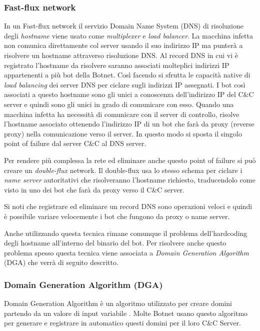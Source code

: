 \subsubsection{Fast-flux network}
\label{fast-flux-network-label}
In un Fast-flux network il servizio Domain Name System (DNS) di risoluzione degli \textit{hostname} viene usato come \textit{multiplexer} e \textit{load balancer}. La macchina infetta non comunica direttamente col server usando il suo indirizzo IP ma punterà a risolvere un hostname attraverso risoluzione DNS. Al record DNS in cui vi è registrato l'hostname da risolvere saranno associati molteplici indirizzi IP appartenenti a più bot della Botnet. Così facendo si sfrutta le capacità native di \textit{load balancing} dei server DNS per ciclare sugli indirizzi IP assegnati. I bot così associati a questo hostname sono gli unici a conoscenza dell'indirizzo IP del C\&C server e quindi sono gli unici in grado di comunicare con esso. 
Quando una macchina infetta ha necessità di comunicare con il server di controllo, risolve l'hostname associato ottenendo l'indirizzo IP di un bot che farà da proxy (reverse proxy) nella comunicazione verso il server.
In questo modo  si sposta il singolo point of failure dal server C\&C al DNS server.

Per rendere più complessa la rete ed eliminare anche questo point of failure si può creare un  \textit{double-flux} network. Il double-flux usa lo stesso schema per ciclare i \textit{name server} autoritativi che risolveranno l'hostname richiesto, traducendolo come visto in uno dei bot che farà da proxy verso il C\&C server. 

Si noti che registrare ed eliminare un  record DNS sono operazioni veloci e quindi è possibile variare velocemente i bot che fungono da proxy o name server.

Anche utilizzando questa tecnica rimane comunque il problema dell'hardcoding degli hostname all'interno del binario del bot. Per risolvere anche questo problema spesso  questa tecnica viene associata a \textit{Domain Generation Algorithm} (DGA) che verrà di seguito descritto.

\subsubsection{Domain Generation Algorithm (DGA)}
\label{DGA}
Domain Generation Algorithm è un algoritmo utilizzato per creare domini partendo da un valore di input variabile \cite{inproceedings}. Molte Botnet usano questo algoritmo per generare e registrare in automatico questi domini per il loro C\&C Server.

